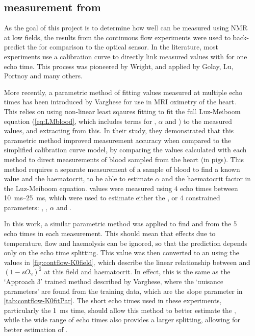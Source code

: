 \subsection{\SOtwo measurement from \Ttwo}
As the goal of this project is to determine how well \SOtwo can be measured using NMR at low fields, the results from the continuous flow experiments were used to back-predict the \SOtwo for comparison to the optical sensor.
In the literature, most experiments use a calibration curve to directly link measured \Ttwo values with \SOtwo for one echo time.
This process was pioneered by Wright\cite{WrightEstimatingoxygensaturation1991}, and applied by Golay\cite{GolayMeasurementtissueoxygen2001}, Lu\cite{LuQuantitativeevaluationoxygenation2008}, Portnoy\cite{PortnoyNoninvasiveevaluationblood2017} and many others.

More recently, a parametric method of fitting \Ttwo values measured at multiple echo times has been introduced by Varghese\cite{VargheseCMRbasedbloodoximetry2017} for use in MRI oximetry of the heart.
This relies on using non-linear least sqaures fitting to fit the full Luz-Meiboom equation (\autoref{eq:LMblood}, which includes terms for \Hct, $\alpha$ and \SOtwo) to the measured \Ttwo values, and extracting \SOtwo from this.
In their study, they demonstrated that this parametric method improved \SOtwo measurement accuracy when compared to the simplified calibration curve model, by comparing the \SOtwo values calculated with each method to direct \SOtwo measurements of blood sampled from the heart (in pigs).
This method requires a separate measurement of a sample of blood to find a known \SOtwo value and the haematocrit, to be able to estimate $\alpha$ and the haematocrit factor in the Luz-Meiboom equation.
\Ttwo values were measured using 4 echo times between \SIrange{10}{25}{ms}, which were used to estimate either the \SOtwo, or 4 constrained parameters: \SOtwo, \Hct, $\alpha$ and \TtwoO.

In this work, a similar parametric method was applied to find \Kzero and \TtwoO from the 5 echo times in each measurement.
This should mean that effects due to temperature, flow and haemolysis can be ignored, so that the \SOtwo prediction depends only on the echo time splitting.
This \Kzero value was then converted to an \SOtwo using the values in \autoref{fig:contflow-K0field}, which describe the linear relationship between \Kzero and $(1-sO_2)^2$ at this field and haematocrit.
In effect, this is the same as the `Approach 3' trained method described by Varghese, where the `nuisance parameters' are found from the training data, which are the slope parameter in \autoref{tab:contflow-K0fitPar}.
The short echo times used in these experiments, particularly the \SI{1}{ms} time, should allow this method to better estimate the \TtwoO, while the wide range of echo times also provides a larger splitting, allowing for better estimation of \Kzero.

